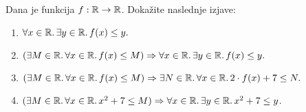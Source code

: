 \begin{vaja}
  Dana je funkcija $f : \mathbb{R} \to \mathbb{R}$. Dokažite naslednje izjave:
  \begin{enumerate}
  \item  $\forall x \in \mathbb{R} .\, \exists y \in \mathbb{R} .\, f(x) \leq y.$
  \item$(\exists M \in \mathbb{R} .\, \forall x \in \mathbb{R} .\, f(x) \leq M) \Rightarrow \forall x \in \mathbb{R} .\, \exists y \in \mathbb{R} .\, f(x) \leq y.$
  \item $(\exists M \in \mathbb{R} .\, \forall x \in \mathbb{R} .\, f(x) \leq M) \Rightarrow \exists N \in \mathbb{R} .\, \forall x \in \mathbb{R} .\, 2 \cdot f(x) + 7 \leq N.$
  \item $(\exists M \in \mathbb{R} .\, \forall x \in \mathbb{R} .\, x^2 + 7 \leq M) \Rightarrow \forall x \in \mathbb{R} .\, \exists y \in \mathbb{R} .\, x^2 + 7 \leq y$.
  \end{enumerate}
\end{vaja}


